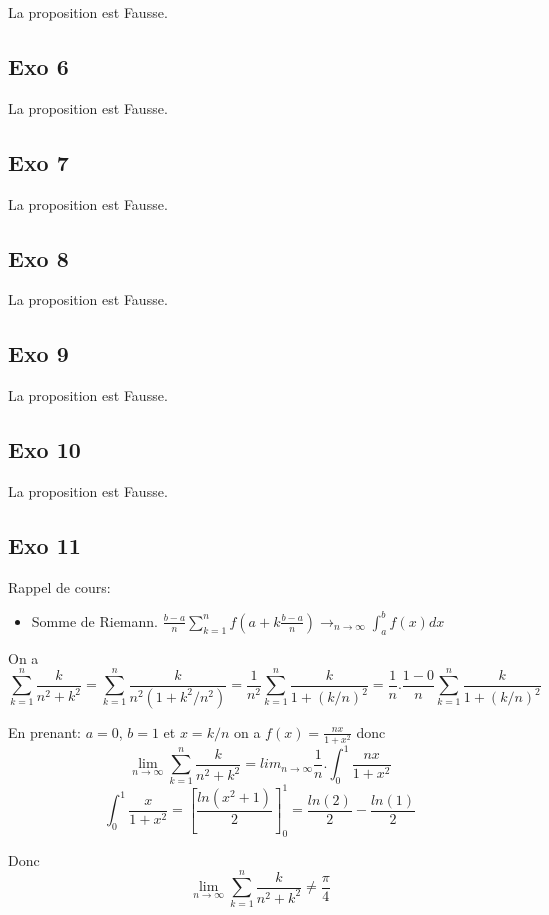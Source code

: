 \documentclass[]{book}
\theoremstyle{definition}
\begin{document}
La proposition est Fausse.

\subsection*{Exo 6}

La proposition est Fausse.

\subsection*{Exo 7}

La proposition est Fausse.

\subsection*{Exo 8}

La proposition est Fausse.

\subsection*{Exo 9}

La proposition est Fausse.

\subsection*{Exo 10}

La proposition est Fausse.

\subsection*{Exo 11}
Rappel de cours:
\begin{itemize}
\item Somme de Riemann. $\frac{b-a}{n}\sum_{k=1}^{n}f(a+k\frac{b-a}{n}) \to_{n \to \infty} \int_{a}^{b} f(x)dx$
\end{itemize}

On a $$\sum_{k=1}^{n}\frac{k}{n^2+k^2} = \sum_{k=1}^{n}\frac{k}{n^2(1+k^2/n^2)} = \frac{1}{n^2}\sum_{k=1}^{n}\frac{k}{1+(k/n)^2} = \frac{1}{n}.\frac{1-0}{n}\sum_{k=1}^{n}\frac{k}{1+(k/n)^2}$$

En prenant: $a=0$, $b=1$ et $x=k/n$ on a $f(x)=\frac{nx}{1+x^2}$ donc
$$\lim_{n \to \infty}\sum_{k=1}^{n}\frac{k}{n^2+k^2} = lim_{n \to \infty}\frac{1}{n}.\int_0^1 \frac{nx}{1+x^2}$$
$$\int_0^1 \frac{x}{1+x^2} = [\frac{ln(x^2+1)}{2}]_0^1 = \frac{ln(2)}{2} - \frac{ln(1)}{2}$$

Donc
$$ \lim_{n \to \infty}\sum_{k=1}^{n}\frac{k}{n^2+k^2} \neq \frac{\pi}{4}$$
\end{document}
